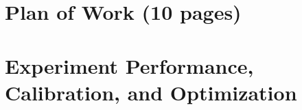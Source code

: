 \documentclass[11pt,onecolumn]{article} %
\begin{document}
\onecolumn


\clearpage


\clearpage
\lhead{}

\tableofcontents
\clearpage

\setcounter{tocdepth}{2}







\section{Plan of Work (10 pages)}


\clearpage

\section{Experiment Performance, Calibration, and Optimization}


\clearpage


\clearpage


\clearpage


















\clearpage
{}



\clearpage
{}



%
%
%
%
\end{document}
